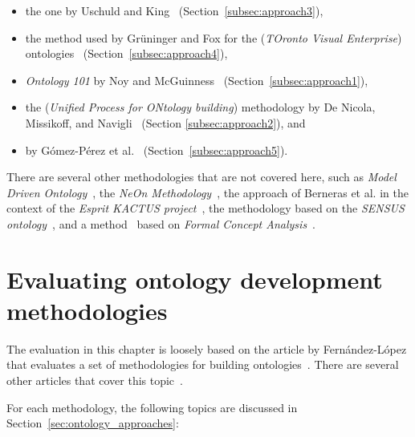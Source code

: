 \begin{itemize}
  \item the one by Uschuld and King~\cite{UscholdKing} (Section~\ref{subsec:approach3}),
  
  \item the method used by Grüninger and Fox for the  (\emph{TOronto Visual Enterprise}) ontologies~\cite{GruningerFox} (Section~\ref{subsec:approach4}),
  
  \item \emph{Ontology 101} by Noy and McGuinness~\cite{Ontology101} (Section~\ref{subsec:approach1}),

  \item the  (\emph{Unified Process for ONtology building}) methodology by De Nicola, Missikoff, and Navigli~\cite{SoftwareEngineeringOntology} (Section \ref{subsec:approach2}), and
  
  \item \methontology by Gómez-Pérez et al.~\cite{Methontology} (Section~\ref{subsec:approach5}).
\end{itemize}

There are several other methodologies that are not covered here, such as \emph{Model Driven Ontology}~\cite{ModelDrivenOntology}, the \emph{NeOn Methodology}~\cite{NeOnMethodology}, the approach of Berneras et al. in the context of the \emph{Esprit KACTUS project}~\cite{KACTUSMethodology}, the methodology based on the \emph{SENSUS ontology}~\cite{SENSUSMethodology}, and a method~\cite{FCAMethod} based on \emph{Formal Concept Analysis}~\cite{FormalConceptAnalysis}.

\section{Evaluating ontology development methodologies}

The evaluation in this chapter is loosely based on the article by Fernández-López that evaluates a set of methodologies for building ontologies~\cite{MethodologyOverview}. There are several other articles that cover this topic~\cite{MethodologyComparison1,MethodologyComparison2,MethodologyComparison3}.

For each methodology, the following topics are discussed in Section~\ref{sec:ontology_approaches}:

